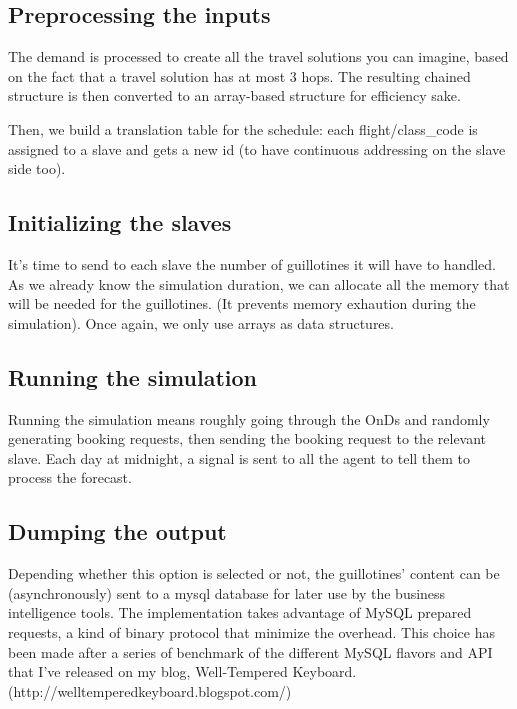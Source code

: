 \documentclass[11pt]{JHEP3}
\begin{document}
\subsection{Preprocessing the inputs}

The demand is processed to create all the travel solutions you can imagine, based on the fact that a travel solution has at most 3 hops. The resulting chained structure is then converted to an array-based structure for efficiency sake.

Then, we build a translation table for the schedule: each flight/class\_code is assigned to a slave and gets a new id (to have continuous addressing on the slave side too).

\subsection{Initializing the slaves}

It's time to send to each slave the number of guillotines it will have to handled. As we already know the simulation duration, we can allocate all the memory that will be needed for the guillotines. (It prevents memory exhaution during the simulation). Once again, we only use arrays as data structures.

\subsection{Running the simulation}

Running the simulation means roughly going through the OnDs and randomly generating booking requests, then sending the booking request to the relevant slave. Each day at midnight, a signal is sent to all the agent to tell them to process the forecast.

\subsection{Dumping the output}

Depending whether this option is selected or not, the guillotines' content can be (asynchronously) sent to a mysql database for later use by the business intelligence tools. The implementation takes advantage of MySQL prepared requests, a kind of binary protocol that minimize the overhead. This choice has been made after a series of benchmark of the different MySQL flavors and API that I've released on my blog, Well-Tempered Keyboard. (http://welltemperedkeyboard.blogspot.com/) 
\end{document}
